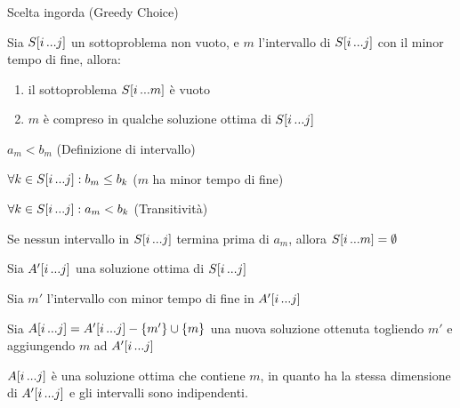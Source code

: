 \begin{frame}{Scelta ingorda (Greedy Choice)}

\vspace{-9pt}
\begin{myboxtitle}[Teorema]
Sia $S[i \mydots j]$ un sottoproblema non vuoto, e $m$ l'intervallo di $S[i \mydots j]$ con il \alert{minor tempo di fine}, allora:
\begin{enumerate}
\item il sottoproblema $S[i \mydots m]$ è vuoto
\item $m$ è compreso in qualche soluzione ottima di $S[i \mydots j]$
\end{enumerate}
\end{myboxtitle}

\vspace{-6pt}
\begin{overprint}
\begin{myboxtitle}

\smallskip
{} \alert{$a_m<b_m$} \hfill (Definizione di intervallo)

\smallskip
{} \alert{$\forall k \in S[i \mydots j]: b_m \leq b_k$} \hfill ($m$ ha minor tempo di fine)

\smallskip
{} \alert{$\forall k \in S[i \mydots j]: a_m < b_k$} \hfill (Transitività)

\bigskip
Se nessun intervallo in $S[i \mydots j]$ termina prima di $a_m$, allora $S[i \mydots m] = \emptyset$
\end{myboxtitle}

\begin{myboxtitle}
\BI
\item Sia \alert{$A'[i \mydots j]$} una soluzione ottima di $S[i \mydots j]$
\item Sia \alert{$m'$} l'intervallo con minor tempo di fine in $A'[i \mydots j]$
\item Sia \alert{$A[i \mydots j] = A'[i \mydots j] - \{ m' \} \cup \{ m \}$} una nuova soluzione
ottenuta togliendo $m'$ e aggiungendo $m$ ad $A'[i \mydots j]$
\item \alert{$A[i \mydots j]$ è una soluzione ottima che contiene $m$}, in quanto ha la 
stessa dimensione di $A'[i \mydots j]$ e gli intervalli sono indipendenti.
\EI
\end{myboxtitle}
\end{overprint}

\end{frame}

